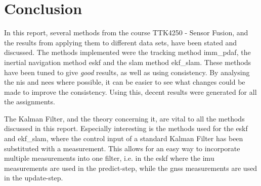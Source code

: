 \section{Conclusion}\label{sec:conclusion}
In this report, several methods from the course TTK4250 - Sensor Fusion, and the results from applying them to different data sets, have been stated and discussed. The methods implemented were the tracking method \acrshort{imm_pdaf}, the inertial navigation method \acrshort{eskf} and the \acrshort{slam} method \acrshort{ekf_slam}. These methods have been tuned to give \textit{good} results, as well as using consistency. By analysing the \acrshort{nis} and \acrshort{nees} where possible, it can be easier to see what changes could be made to improve the consistency. Using this, decent results were generated for all the assignments. 

The Kalman Filter, and the theory concerning it, are vital to all the methods discussed in this report. Especially interesting is the methods used for the \acrshort{eskf} and \acrshort{ekf_slam}, where the control input of a standard Kalman Filter has been substituted with a measurement. This allows for an easy way to incorporate multiple measurements into one filter, i.e. in the \acrshort{eskf} where the \acrshort{imu} measurements are used in the predict-step, while the \acrshort{gnss} measurements are used in the update-step. 





